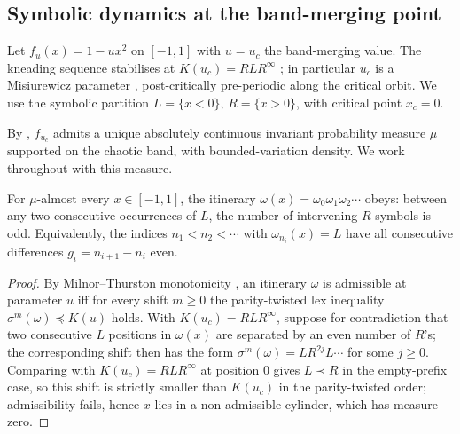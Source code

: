 
\subsection{Symbolic dynamics at the band-merging point}

Let $f_u(x) = 1 - u x^2$ on $[-1, 1]$ with $u = u_c$ the band-merging
value. The kneading sequence stabilises at $K(u_c) = R L R^\infty$
\cite{milnor1988iterated}; in particular $u_c$ is a Misiurewicz
parameter \cite{misiurewicz1981absolutely}, post-critically pre-periodic
along the critical orbit. We use the symbolic partition
$L = \{x < 0\}$, $R = \{x > 0\}$, with critical point $x_c = 0$.

By \cite{misiurewicz1981absolutely}, $f_{u_c}$ admits a unique absolutely
continuous invariant probability measure $\mu$ supported on the chaotic
band, with bounded-variation density. We work throughout with this
measure.

\begin{lemma}
\label{lem:parity-skeleton}
For $\mu$-almost every $x \in [-1, 1]$, the itinerary
$\omega(x) = \omega_0 \omega_1 \omega_2 \cdots$ obeys: between any two
consecutive occurrences of $L$, the number of intervening $R$ symbols
is odd. Equivalently, the indices $n_1 < n_2 < \cdots$ with
$\omega_{n_i}(x) = L$ have all consecutive differences
$g_i = n_{i+1} - n_i$ even.
\end{lemma}

\begin{proof}
By Milnor--Thurston monotonicity \cite{milnor1988iterated}, an itinerary
$\omega$ is admissible at parameter $u$ iff for every shift $m \geq 0$
the parity-twisted lex inequality $\sigma^m(\omega) \preceq K(u)$ holds.
With $K(u_c) = R L R^\infty$, suppose for contradiction that two
consecutive $L$ positions in $\omega(x)$ are separated by an even number
of $R$'s; the corresponding shift then has the form
$\sigma^m(\omega) = L R^{2j} L \cdots$ for some $j \geq 0$. Comparing
with $K(u_c) = R L R^\infty$ at position $0$ gives $L \prec R$ in the
empty-prefix case, so this shift is strictly smaller than $K(u_c)$ in
the parity-twisted order; admissibility fails, hence $x$ lies in a
non-admissible cylinder, which has measure zero.
\end{proof}

